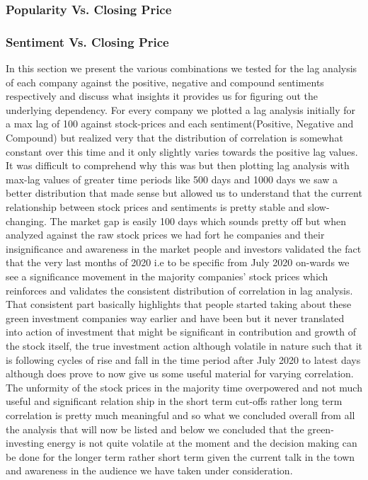 \documentclass[sigconf, nonacm]{acmart}
\begin{document}
\subsubsection{Popularity Vs. Closing Price}
\subsubsection{Sentiment Vs. Closing Price}
In this section we present the various combinations we tested for the lag analysis of each company against the positive, negative and compound sentiments respectively and discuss what insights it provides us for figuring out the underlying dependency. For every company we plotted a lag analysis initially for a max lag of 100 against stock-prices and each sentiment(Positive, Negative and Compound) but realized very that the distribution of correlation is somewhat constant over this time and it only slightly varies towards the positive lag values. It was difficult to comprehend why this was but then plotting lag analysis with max-lag values of greater time periods like 500 days and 1000 days we saw a better distribution that made sense but allowed us to understand that the current relationship between stock prices and sentiments is pretty stable and slow-changing. The market gap is easily 100 days which sounds pretty off but when analyzed against the raw stock prices we had fort he companies and their insignificance and awareness in the market people and investors validated the fact that the very last months of 2020 i.e to be specific from July 2020 on-wards we see a significance movement in the majority companies' stock prices which reinforces and validates the consistent distribution of correlation in lag analysis. That consistent part basically highlights that people started taking about these green investment companies way earlier and have been but it never translated into action of investment that might be significant in contribution and growth of the stock itself, the true investment action although volatile in nature such that it is following cycles of rise and fall in the time period after July 2020 to latest days although does prove to now give us some useful material for varying correlation. The unformity of the stock prices in the majority time overpowered and not much useful and significant relation ship in the short term cut-offs rather long term correlation is pretty much meaningful and so what we concluded overall from all the analysis that will now be listed and below we concluded that the green-investing energy is not quite volatile at the moment and the decision making can be done for the longer term rather short term given the current talk in the town and awareness in the audience we have taken under consideration. 
\end{document}
